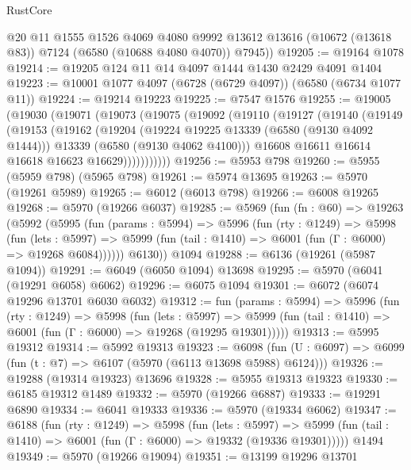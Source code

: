 \begin{lexlean}{RustCore}
\begin{coremodule}
        @20
        @11
        @1555
        @1526
        @4069
        @4080
        @9992
        @13612
        @13616
        (@10672 (@13618 @83))
        @7124
        (@6580 (@10688 @4080 @4070))
        @7945))
@19205 := @19164 @1078
@19214 := @19205 @124 @11 @14 @4097 @1444 @1430 @2429 @4091 @1404
@19223 := @10001 @1077 @4097 (@6728 (@6729 @4097)) (@6580 (@6734 @1077 @11))
@19224 := @19214 @19223
@19225 := @7547 @1576
@19255 := @19005
    (@19030
      (@19071
        (@19073
          (@19075
            (@19092
              (@19110
                (@19127
                  (@19140
                    (@19149
                      (@19153
                        (@19162
                          (@19204
                            (@19224 @19225 @13339 (@6580 (@9130 @4092 @1444)))
                            @13339
                            (@6580 (@9130 @4062 @4100)))
                          @16608
                          @16611
                          @16614
                          @16618
                          @16623
                          @16629)))))))))))
@19256 := @5953 @798
@19260 := @5955 (@5959 @798) (@5965 @798)
@19261 := @5974 @13695
@19263 := @5970 (@19261 @5989)
@19265 := @6012 (@6013 @798)
@19266 := @6008 @19265
@19268 := @5970 (@19266 @6037)
@19285 := @5969
    (fun (fn : @60) =>
    @19263
      (@5992
        (@5995
          (fun (params : @5994) =>
          @5996
            (fun (rty : @1249) =>
            @5998
              (fun (lets : @5997) =>
              @5999 (fun (tail : @1410) => @6001 (fun (Γ : @6000) => @19268 @6084))))))
        @6130))
    @1094
@19288 := @6136 (@19261 (@5987 @1094))
@19291 := @6049 (@6050 @1094) @13698
@19295 := @5970 (@6041 (@19291 @6058) @6062)
@19296 := @6075 @1094
@19301 := @6072 (@6074 @19296 @13701 @6030 @6032)
@19312 := fun (params : @5994) =>
  @5996
    (fun (rty : @1249) =>
    @5998
      (fun (lets : @5997) =>
      @5999 (fun (tail : @1410) => @6001 (fun (Γ : @6000) => @19268 (@19295 @19301)))))
@19313 := @5995 @19312
@19314 := @5992 @19313
@19323 := @6098
    (fun (U : @6097) => @6099 (fun (t : @7) => @6107 (@5970 (@6113 @13698 @5988) @6124)))
@19326 := @19288 (@19314 @19323) @13696
@19328 := @5955 @19313 @19323
@19330 := @6185 @19312 @1489
@19332 := @5970 (@19266 @6887)
@19333 := @19291 @6890
@19334 := @6041 @19333
@19336 := @5970 (@19334 @6062)
@19347 := @6188
    (fun (rty : @1249) =>
    @5998
      (fun (lets : @5997) =>
      @5999 (fun (tail : @1410) => @6001 (fun (Γ : @6000) => @19332 (@19336 @19301)))))
    @1494
@19349 := @5970 (@19266 @19094)
@19351 := @13199 @19296 @13701

\end{coremodule}
\end{lexlean}

